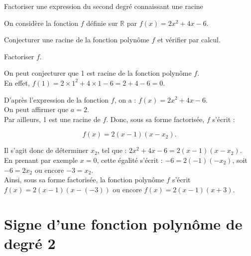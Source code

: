 	\begin{bmethodet}{Factoriser une expression du second degré connaissant une racine}
		
		On considère la fonction $f$ définie sur $\mathbb{R}$ par $f(x)=2 x^{2}+4 x-6$.
		
		\begin{enumMet}
			\item Conjecturer une racine de la fonction polynôme $f$ et vérifier par calcul.
			\item Factoriser $f$.
		\end{enumMet}
		
		
		\begin{itemMet}
			\item On peut conjecturer que 1 est racine de la fonction polynôme $f$.\\
			En effet, $f(1)=2 \times 1^{2}+4 \times 1-6=2+4-6=0$.\\
			\item D'après l'expression de la fonction $f$, on a : $f(x)=2 x^{2}+4 x-6$.\\
			On peut affirmer que $a=2$.\\
			Par ailleurs, 1 est une racine de $f$. Donc, sous sa forme factorisée, $f$ s'écrit :
			
			$$
			f(x)=2(x-1)\left(x-x_{2}\right) .
			$$
			
			Il s'agit donc de déterminer $x_{2}$, tel que : $2 x^{2}+4 x-6=2(x-1)\left(x-x_{2}\right)$.\\
			En prenant par exemple $x=0$, cette égalité s'écrit : $-6=2(-1)\left(-x_{2}\right)$, soit $-6=2 x_{2}$ ou encore $-3=x_{2}$.\\
			Ainsi, sous sa forme factorisée, la fonction polynôme $f$ s'écrit $f(x)=2(x-1)(x-(-3))$ ou encore $f(x)=2(x-1)(x+3)$.
		\end{itemMet}
		
		\end{bmethodet}
	
	
	\section{Signe d'une fonction polynôme de degré 2}
	
